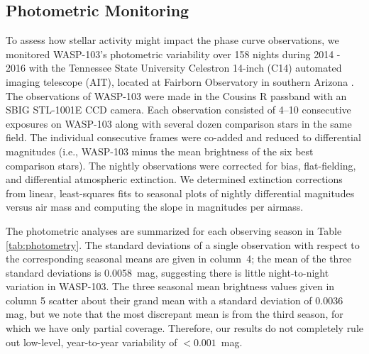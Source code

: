 \documentclass[twocolumn, trackchanges]{aastex61}
\begin{document}

\subsection{Photometric Monitoring}
To assess how stellar activity might impact the phase curve observations, we monitored WASP-103's photometric variability over 158 nights during 2014 - 2016 with the Tennessee State University Celestron 14-inch (C14) automated imaging telescope (AIT), located at Fairborn Observatory in southern Arizona \citep[][]{henry99}.  The observations of WASP-103 were made in the Cousins R passband with an SBIG STL-1001E CCD camera.  Each observation consisted of 4--10 consecutive exposures on WASP-103 along with several dozen comparison stars in the same field. The individual consecutive frames were co-added and reduced to differential magnitudes (i.e., WASP-103 minus the mean brightness of the six best comparison stars). The nightly observations were corrected for bias, flat-fielding, and differential atmospheric extinction.  We determined extinction corrections from linear, least-squares fits to seasonal plots of nightly differential magnitudes versus air mass and computing the slope in magnitudes per airmass.

The photometric analyses are summarized for each observing season in Table\,\ref{tab:photometry}.  The standard deviations of a single observation with respect to the corresponding seasonal means are given in column~4; the mean of the three standard deviations is 0.0058~mag, suggesting there is little night-to-night variation in WASP-103.  The three seasonal mean brightness values given in column 5 scatter about their grand mean with a standard deviation of 0.0036 mag, but we note that the most discrepant mean is from the third season, for which we have only partial coverage. Therefore, our results do not completely rule out low-level, year-to-year variability of $<0.001$~mag.
\end{document}
